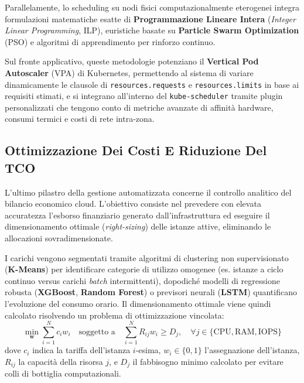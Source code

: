 \documentclass[11pt, a4paper]{article}
\begin{document}
Parallelamente, lo scheduling su nodi fisici computazionalmente eterogenei integra formulazioni matematiche esatte di \textbf{Programmazione Lineare Intera} (\emph{Integer Linear Programming}, ILP), euristiche basate su \textbf{Particle Swarm Optimization} (PSO) e algoritmi di apprendimento per rinforzo continuo.

Sul fronte applicativo, queste metodologie potenziano il \textbf{Vertical Pod Autoscaler} (VPA) di Kubernetes, permettendo al sistema di variare dinamicamente le clausole di \texttt{resources.requests} e \texttt{resources.limits} in base ai requisiti stimati, e si integrano all'interno del \texttt{kube-scheduler} tramite plugin personalizzati che tengono conto di metriche avanzate di affinità hardware, consumi termici e costi di rete intra-zona.


\subsection{Ottimizzazione Dei Costi E Riduzione Del TCO}

L'ultimo pilastro della gestione automatizzata concerne il controllo analitico del bilancio economico cloud. L'obiettivo consiste nel prevedere con elevata accuratezza l'esborso finanziario generato dall'infrastruttura ed eseguire il dimensionamento ottimale (\emph{right-sizing}) delle istanze attive, eliminando le allocazioni sovradimensionate.

I carichi vengono segmentati tramite algoritmi di clustering non supervisionato (\textbf{K-Means}) per identificare categorie di utilizzo omogenee (es. istanze a ciclo continuo versus carichi \emph{batch} intermittenti), dopodiché modelli di regressione robusta (\textbf{XGBoost}, \textbf{Random Forest}) o previsori neurali (\textbf{LSTM}) quantificano l'evoluzione del consumo orario. Il dimensionamento ottimale viene quindi calcolato risolvendo un problema di ottimizzazione vincolata:
\begin{equation}
    \min_{\bm{w}} \sum_{i=1}^N c_i w_i \quad \text{soggetto a} \quad \sum_{i=1}^N R_{ij} w_i \ge D_j, \quad \forall j \in \{\text{CPU}, \text{RAM}, \text{IOPS}\}
\end{equation}
dove $c_i$ indica la tariffa dell'istanza $i$-esima, $w_i \in \{0, 1\}$ l'assegnazione dell'istanza, $R_{ij}$ la capacità della risorsa $j$, e $D_j$ il fabbisogno minimo calcolato per evitare colli di bottiglia computazionali.
\end{document}
